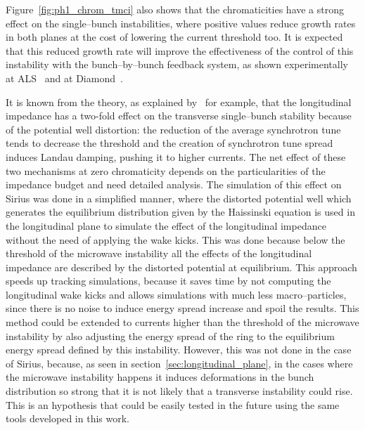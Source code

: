     Figure~\ref{fig:ph1_chrom_tmci} also shows that the chromaticities have a strong effect on the single--bunch instabilities, where positive values reduce growth rates in both planes at the cost of lowering the current threshold too. It is expected that this reduced growth rate will improve the effectiveness of the control of this instability with the bunch--by--bunch feedback system, as shown experimentally at ALS~\cite{Byrd1997} and at Diamond~\cite{Koukovini-Platia2017}.

    It is known from the theory, as explained by~ for example, that the longitudinal impedance has a two-fold effect on the transverse single--bunch stability because of the potential well distortion: the reduction of the average synchrotron tune tends to decrease the threshold and the creation of synchrotron tune spread induces Landau damping, pushing it to higher currents. The net effect of these two mechanisms at zero chromaticity depends on the particularities of the impedance budget and need detailed analysis. The simulation of this effect on Sirius was done in a simplified manner, where the distorted potential well which generates the equilibrium distribution given by the Haissinski equation is used in the longitudinal plane to simulate the effect of the longitudinal impedance without the need of applying the wake kicks. This was done because below the threshold of the microwave instability all the effects of the longitudinal impedance are described by the distorted potential at equilibrium. This approach speeds up tracking simulations, because it saves time by not computing the longitudinal wake kicks and allows simulations with much less macro--particles, since there is no noise to induce energy spread increase and spoil the results. This method could be extended to currents higher than the threshold of the microwave instability by also adjusting the energy spread of the ring to the equilibrium energy spread defined by this instability. However, this was not done in the case of Sirius, because, as seen in section~\ref{sec:longitudinal_plane}, in the cases where the microwave instability happens it induces deformations in the bunch distribution so strong that it is not likely that a transverse instability could rise. This is an hypothesis that could be easily tested in the future using the same tools developed in this work.

